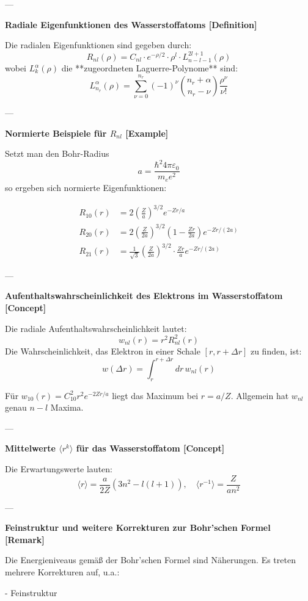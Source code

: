 \documentclass[10pt, letterpaper]{article}
\begin{document}
---

\textbf{Radiale Eigenfunktionen des Wasserstoffatoms [Definition]}

Die radialen Eigenfunktionen sind gegeben durch:
\[
R_{nl}(\rho) = C_{nl} \cdot e^{-\rho/2} \cdot \rho^l \cdot L_{n-l-1}^{2l+1}(\rho)
\]
wobei $L_k^\alpha(\rho)$ die **zugeordneten Laguerre-Polynome** sind:
\[
L_{n_r}^\alpha(\rho) = \sum_{\nu=0}^{n_r} (-1)^\nu \binom{n_r + \alpha}{n_r - \nu} \frac{\rho^\nu}{\nu!}
\]

---

\textbf{Normierte Beispiele für $R_{nl}$ [Example]}

Setzt man den Bohr-Radius
\[
a = \frac{\hbar^2 4 \pi \varepsilon_0}{m_e e^2}
\]
so ergeben sich normierte Eigenfunktionen:

\[
\begin{aligned}
R_{10}(r) &= 2 \left( \frac{Z}{a} \right)^{3/2} e^{-Zr/a} \\
R_{20}(r) &= 2 \left( \frac{Z}{2a} \right)^{3/2} \left(1 - \frac{Zr}{2a} \right) e^{-Zr/(2a)} \\
R_{21}(r) &= \frac{1}{\sqrt{3}} \left( \frac{Z}{2a} \right)^{3/2} \cdot \frac{Zr}{a} e^{-Zr/(2a)}
\end{aligned}
\]

---

\textbf{Aufenthaltswahrscheinlichkeit des Elektrons im Wasserstoffatom [Concept]}

Die radiale Aufenthaltswahrscheinlichkeit lautet:
\[
w_{nl}(r) = r^2 R_{nl}^2(r)
\]
Die Wahrscheinlichkeit, das Elektron in einer Schale $[r, r+\Delta r]$ zu finden, ist:
\[
w(\Delta r) = \int_r^{r+\Delta r} dr \, w_{nl}(r)
\]

Für $w_{10}(r) = C_{10}^2 r^2 e^{-2Zr/a}$ liegt das Maximum bei $r = a/Z$. Allgemein hat $w_{nl}$ genau $n - l$ Maxima.

---

\textbf{Mittelwerte $\langle r^k \rangle$ für das Wasserstoffatom [Concept]}

Die Erwartungswerte lauten:
\[
\langle r \rangle = \frac{a}{2Z}(3n^2 - l(l+1)), \quad \langle r^{-1} \rangle = \frac{Z}{a n^2}
\]

---

\textbf{Feinstruktur und weitere Korrekturen zur Bohr'schen Formel [Remark]}

Die Energieniveaus gemäß der Bohr’schen Formel sind Näherungen. Es treten mehrere Korrekturen auf, u.a.:

- Feinstruktur
\end{document}
